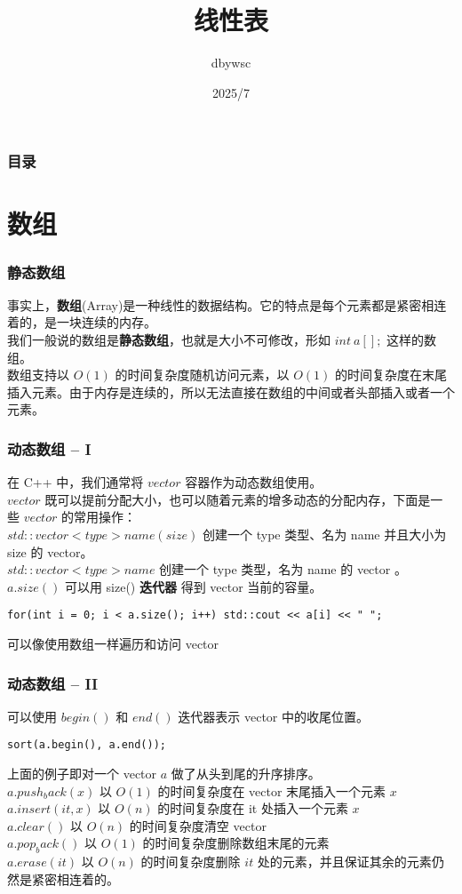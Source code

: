 \documentclass{beamer}
\title{线性表}
\author{dbywsc}
\date{2025/7}
\newcommand{\fdf}[1]{\alert{\textbf{#1}}}
\begin{document}
\frame{\titlepage}
\begin{frame}
	\frametitle{目录}
	\tableofcontents
\end{frame}
\section{数组}
\begin{frame}
\frametitle{静态数组}
事实上，\fdf{数组}(Array)是一种线性的数据结构。它的特点是每个元素都是紧密相连着的，是一块连续的内存。\\ 
我们一般说的数组是\fdf{静态数组}，也就是大小不可修改，形如 $int \ a[];$ 这样的数组。 \\ 
数组支持以 $O(1)$ 的时间复杂度随机访问元素，以 $O(1)$ 的时间复杂度在末尾插入元素。由于内存是连续的，所以无法直接在数组的中间或者头部插入或者一个元素。
\end{frame}
\begin{frame}[fragile]
\frametitle{动态数组 -- I}
在 C++ 中，我们通常将 $vector$ 容器作为动态数组使用。\\ 
$vector$ 既可以提前分配大小，也可以随着元素的增多动态的分配内存，下面是一些 $vector$ 的常用操作：\\
$std::vector<type> name(size)$ 创建一个 type 类型、名为 name 并且大小为 size 的 vector。\\
$std::vector<type> name$ 创建一个 type 类型，名为 name 的 vector 。 \\
$a.size()$ 可以用 size() \fdf{迭代器} 得到 vector 当前的容量。\\
\begin{onlyenv}
\begin{verbatim}
for(int i = 0; i < a.size(); i++) std::cout << a[i] << " ";
\end{verbatim}
\end{onlyenv}
可以像使用数组一样遍历和访问 vector 
\end{frame}
\begin{frame}[fragile]
\frametitle{动态数组 -- II}
可以使用 $begin()$ 和 $end()$ 迭代器表示 vector 中的收尾位置。\\
\begin{onlyenv}
\begin{verbatim}
sort(a.begin(), a.end());
\end{verbatim}
\end{onlyenv}
上面的例子即对一个 vector $a$ 做了从头到尾的升序排序。\\
$a.push_back(x)$ 以 $O(1)$ 的时间复杂度在 vector 末尾插入一个元素 $x$ \\ 
$a.insert(it, x)$ 以 $O(n)$ 的时间复杂度在 it 处插入一个元素 $x$ \\ 
$a.clear()$ 以 $O(n)$ 的时间复杂度清空 vector \\ 
$a.pop_back()$ 以 $O(1)$ 的时间复杂度删除数组末尾的元素 \\ 
$a.erase(it)$ 以 $O(n)$ 的时间复杂度删除 $it$ 处的元素，并且保证其余的元素仍然是紧密相连着的。
\end{frame}
\end{document}
